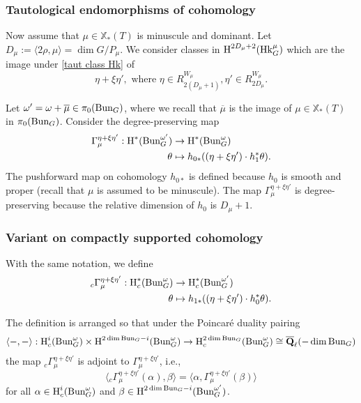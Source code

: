 \documentclass[reqno]{amsart}
\numberwithin{equation}{subsection}
\theoremstyle{definition}
\newcommand{\TF}[1]{{\color{ForestGreen}{#1}}}
\newcommand{\Bun}{\textup{Bun}}
\newcommand\Hk{\mathrm{Hk}}
\newcommand\xcoch{\mathbb{X}_*}
\newcommand{\Qlbar}{\overline{\Q}_\ell}
\renewcommand{\j}[1]{\langle{#1}\rangle}
\newcommand{\ov}{\overline}
\newcommand{\cohog}[2]{\textup{H}^{#1}({#2})}     %
\newcommand{\cohoc}[2]{\textup{H}_{c}^{#1}({#2})}     %
\newcommand\mt{\mapsto}
\newcommand\G\Gamma
\renewcommand{\th}{\theta}
\newcommand{\y}{\eta}
\newcommand{\om}{\omega}
\newcommand\Yun[1]{{\color{red} Y:#1}}
\newcommand\mnote[1]{\marginpar{\tiny #1}}
\newcommand{\Q}{\mathbf{Q}}
\begin{document}
\subsubsection{Tautological endomorphisms of cohomology}\label{ssec:split-Gamma}

Now assume that $\mu \in \xcoch(T)$ is minuscule and dominant. Let $D_\mu :=\j{2\rho,\mu} = \dim G/P_{\mu}$.  We consider classes in $\cohog{2D_\mu+2}{\Hk^\mu_G}$ which are the image under \eqref{taut class Hk} of 
\begin{equation*}
    \y+\xi\y', \mbox{ where } \y\in R^{W_\mu}_{2(D_\mu+1)}, \y'\in R^{W_\mu}_{2D_\mu}.
\end{equation*}

Let $\om'=\om+\ov \mu \in \pi_{0}(\Bun_{G})$, where we recall that $\ov \mu$ is the image of $\mu\in \xcoch(T)$ in $\pi_{0}(\Bun_{G})$. Consider the degree-preserving map 
\begin{align}\label{eq: g^yy'}
\G_{\mu}^{\y+\xi\y'}: \cohog{*}{\Bun^{\om'}_{G}}&\to \cohog{*}{\Bun^{\om}_{G}}\\
\th &\mt h_{0*}((\y+\xi\y')\cdot h_{1}^{*}\th).
\end{align}
The pushforward map on cohomology $h_{0*}$ is defined because $h_0$ is smooth and proper (recall that $\mu$ is assumed to be minuscule). The map $\G_{\mu}^{\y+\xi\y'}$ is degree-preserving because the relative dimension of $h_0$ is $D_\mu+1$.

\subsubsection{Variant on compactly supported cohomology}\label{sss:Gamma c}
With the same notation, we define 
\begin{align}\label{Gamma c}
{}_{c}\Gamma^{\eta + \xi \eta'}_\mu: \cohoc{*}{\Bun^{\om}_{G}}&\to \cohoc{*}{\Bun^{\om'}_{G}}\\
\th &\mt h_{1*}((\eta + \xi \eta')\cdot h_0^*\th).
\end{align}


The definition is arranged so that under the Poincar\'e duality pairing
\begin{equation}\label{PD}
\j{-,- }: \cohoc{i}{\Bun^\omega_G}\times \cohog{2\dim \Bun_G-i}{\Bun^{\omega}_{G}}\to \cohoc{2\dim \Bun_G}{\Bun^{\omega}_{G}}\cong \Qlbar(-\dim \Bun_G)
\end{equation}
the map ${}_c\Gamma^{\eta + \xi \eta'}_\mu$ is adjoint to $\Gamma^{\eta + \xi \eta'}_\mu$, i.e.,
\begin{equation}\label{Gamma adj}
\j{{}_{c}\Gamma^{\eta + \xi \eta'}_\mu (\alpha), \beta}=\j{\alpha, \Gamma^{\eta + \xi \eta'}_{\mu}(\beta)}
\end{equation}
for all $\alpha\in \cohoc{i}{\Bun_{G}^\omega}$ and $\beta\in \cohog{2\dim \Bun_G-i}{\Bun^{\omega'}_{G}}$. 
\end{document}
